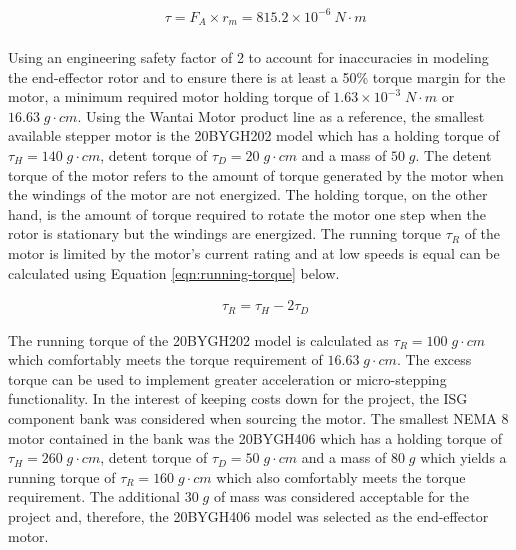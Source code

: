 \begin{align}
	& \tau = F_A \times r_m = 815.2 \times 10^{-6} \: N \cdot m
	\label{eqn:end-effector-motor-torque} \\
\end{align}

Using an engineering safety factor of 2 to account for inaccuracies in modeling the end-effector rotor and to ensure there is at least a 50\% torque margin for the motor, a minimum required motor holding torque of $1.63 \times 10^{-3} \; N \cdot m$ or $16.63 \; g \cdot cm$. Using the Wantai Motor product line as a reference, the smallest available stepper motor is the 20BYGH202 model which has a holding torque of $\tau_H=140 \; g \cdot cm$, detent torque of $\tau_D=20 \; g \cdot cm$ and a mass of $50 \; g$. The detent torque of the motor refers to the amount of torque generated by the motor when the windings of the motor are not energized. The holding torque, on the other hand, is the amount of torque required to rotate the motor one step when the rotor is stationary but the windings are energized. The running torque $\tau_R$ of the motor is limited by the motor's current rating and at low speeds is equal can be calculated using Equation \ref{eqn:running-torque} below.

\begin{align}
	& \tau_R = \tau_H - 2\tau_D
	\label{eqn:running-torque}
\end{align}

The running torque of the 20BYGH202 model is calculated as $\tau_R=100 \; g \cdot cm$ which comfortably meets the torque requirement of $16.63 \; g \cdot cm$. The excess torque can be used to implement greater acceleration or micro-stepping functionality. In the interest of keeping costs down for the project, the ISG component bank was considered when sourcing the motor. The smallest NEMA 8 motor contained in the bank was the 20BYGH406 which has a holding torque of $\tau_H=260 \; g \cdot cm$, detent torque of $\tau_D=50 \; g \cdot cm$ and a mass of $80 \; g$ which yields a running torque of $\tau_R=160 \; g \cdot cm$ which also comfortably meets the torque requirement. The additional $30\;g$ of mass was considered acceptable for the project and, therefore, the 20BYGH406 model was selected as the end-effector motor.

